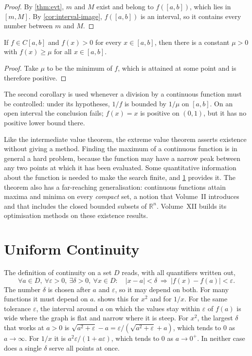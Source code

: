 \begin{proof}
By \cref{thm:evt}, $m$ and $M$ exist and belong to $f([a,b])$, which lies in $[m,M]$. By \cref{cor:interval-image}, $f([a,b])$ is an interval, so it contains every number between $m$ and $M$.
\end{proof}

\begin{corollary}
\label{cor:positive-lower-bound}
If $f\in C[a,b]$ and $f(x)>0$ for every $x\in[a,b]$, then there is a constant $\mu>0$ with $f(x)\ge\mu$ for all $x\in[a,b]$.
\end{corollary}

\begin{proof}
Take $\mu$ to be the minimum of $f$, which is attained at some point and is therefore positive.
\end{proof}

The second corollary is used whenever a division by a continuous function must be controlled: under its hypotheses, $1/f$ is bounded by $1/\mu$ on $[a,b]$. On an open interval the conclusion fails; $f(x)=x$ is positive on $(0,1)$, but it has no positive lower bound there.

Like the intermediate value theorem, the extreme value theorem asserts existence without giving a method. Finding the maximum of a continuous function is in general a hard problem, because the function may have a narrow peak between any two points at which it has been evaluated. Some quantitative information about the function is needed to make the search finite, and \cref{sec:uniform} provides it. The theorem also has a far-reaching generalisation: continuous functions attain maxima and minima on every \emph{compact} set, a notion that Volume~II introduces and that includes the closed bounded subsets of $\mathbb R^n$. Volume~XII builds its optimisation methods on these existence results.

\section{Uniform Continuity}
\label{sec:uniform}

The definition of continuity on a set $D$ reads, with all quantifiers written out,
\[
\forall a\in D,\ \forall\varepsilon>0,\ \exists\delta>0,\ \forall x\in D:\quad|x-a|<\delta\ \Rightarrow\ |f(x)-f(a)|<\varepsilon .
\]
The number $\delta$ is chosen after $a$ and $\varepsilon$, so it may depend on both. For many functions it must depend on $a$.  shows this for $x^2$ and for $1/x$. For the same tolerance $\varepsilon$, the interval around $a$ on which the values stay within $\varepsilon$ of $f(a)$ is wide where the graph is flat and narrow where it is steep. For $x^2$, the largest $\delta$ that works at $a>0$ is $\sqrt{a^2+\varepsilon}-a=\varepsilon/(\sqrt{a^2+\varepsilon}+a)$, which tends to $0$ as $a\to\infty$. For $1/x$ it is $a^2\varepsilon/(1+a\varepsilon)$, which tends to $0$ as $a\to0^+$. In neither case does a single $\delta$ serve all points at once.


